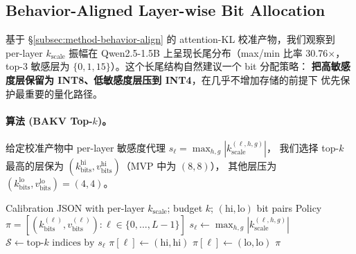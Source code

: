 %


\subsection{Behavior-Aligned Layer-wise Bit Allocation}
\label{subsec:method-allocator}

基于 §\ref{subsec:method-behavior-align} 的 attention-KL 校准产物，我们观察到
per-layer $k_{\text{scale}}$ 振幅在 Qwen2.5-1.5B 上呈现长尾分布（max/min 比率 30.76$\times$，
top-3 敏感层为 $\{0, 1, 15\}$）。这个长尾结构自然建议一个 bit 分配策略：
\textbf{把高敏感度层保留为 INT8、低敏感度层压到 INT4}，在几乎不增加存储的前提下
优先保护最重要的量化路径。

\paragraph{算法 (BAKV Top-$k$)。}
给定校准产物中 per-layer 敏感度代理 $s_\ell = \max_{h, g} |k_{\text{scale}}^{(\ell, h, g)}|$，
我们选择 top-$k$ 最高的层保为 $(k_\text{bits}^{\text{hi}}, v_\text{bits}^{\text{hi}})$（MVP 中为 $(8, 8)$），
其他层压为 $(k_\text{bits}^{\text{lo}}, v_\text{bits}^{\text{lo}}) = (4, 4)$。

\begin{algorithm}[!htbp]
\caption{BAKV Top-$k$ Layer-wise Bit Allocation}
\label{alg:bakv-top-k}
\begin{algorithmic}[1]
\Require Calibration JSON with per-layer $k_\text{scale}$; budget $k$; $(\text{hi}, \text{lo})$ bit pairs
\Ensure Policy $\pi = [(k_{\text{bits}}^{(\ell)}, v_{\text{bits}}^{(\ell)}) : \ell \in \{0, ..., L-1\}]$
\State $s_\ell \leftarrow \max_{h, g} |k_{\text{scale}}^{(\ell, h, g)}|$ 
\State $\mathcal{S} \leftarrow \text{top-}k\text{ indices by } s_\ell$
        \State $\pi[\ell] \leftarrow (\text{hi}, \text{hi})$
    \Else
        \State $\pi[\ell] \leftarrow (\text{lo}, \text{lo})$
    \EndIf
\EndFor
\State \Return $\pi$
\end{algorithmic}
\end{algorithm}


